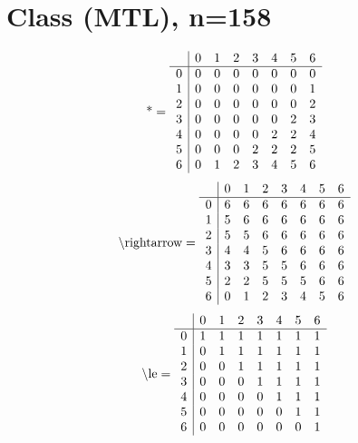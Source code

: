\documentclass[11pt]{article}
\begin{document}
\section{Class (MTL), n=158}
\[\text{*} = 
\begin{array}{r | r r r r r r r}
 & 0 & 1 & 2 & 3 & 4 & 5 & 6 \\ \hline
0 & 0 & 0 & 0 & 0 & 0 & 0 & 0 \\
1 & 0 & 0 & 0 & 0 & 0 & 0 & 1 \\
2 & 0 & 0 & 0 & 0 & 0 & 0 & 2 \\
3 & 0 & 0 & 0 & 0 & 0 & 2 & 3 \\
4 & 0 & 0 & 0 & 0 & 2 & 2 & 4 \\
5 & 0 & 0 & 0 & 2 & 2 & 2 & 5 \\
6 & 0 & 1 & 2 & 3 & 4 & 5 & 6 \\
\end{array}
\]
\[\text{\textbackslash rightarrow} = 
\begin{array}{r | r r r r r r r}
 & 0 & 1 & 2 & 3 & 4 & 5 & 6 \\ \hline
0 & 6 & 6 & 6 & 6 & 6 & 6 & 6 \\
1 & 5 & 6 & 6 & 6 & 6 & 6 & 6 \\
2 & 5 & 5 & 6 & 6 & 6 & 6 & 6 \\
3 & 4 & 4 & 5 & 6 & 6 & 6 & 6 \\
4 & 3 & 3 & 5 & 5 & 6 & 6 & 6 \\
5 & 2 & 2 & 5 & 5 & 5 & 6 & 6 \\
6 & 0 & 1 & 2 & 3 & 4 & 5 & 6 \\
\end{array}
\]
\[\text{\textbackslash le} = 
\begin{array}{r | r r r r r r r}
 & 0 & 1 & 2 & 3 & 4 & 5 & 6 \\ \hline
0 & 1 & 1 & 1 & 1 & 1 & 1 & 1 \\
1 & 0 & 1 & 1 & 1 & 1 & 1 & 1 \\
2 & 0 & 0 & 1 & 1 & 1 & 1 & 1 \\
3 & 0 & 0 & 0 & 1 & 1 & 1 & 1 \\
4 & 0 & 0 & 0 & 0 & 1 & 1 & 1 \\
5 & 0 & 0 & 0 & 0 & 0 & 1 & 1 \\
6 & 0 & 0 & 0 & 0 & 0 & 0 & 1 \\
\end{array}
\]
\end{document}
